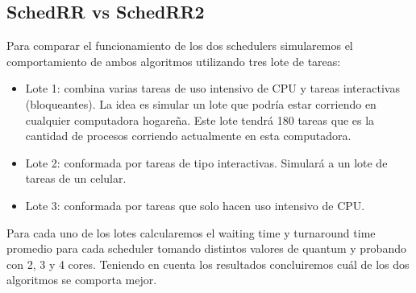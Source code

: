 \subsection{SchedRR vs SchedRR2}

Para comparar el funcionamiento de los dos schedulers simularemos el comportamiento de ambos algoritmos utilizando tres lote de tareas:
\begin{itemize}
	\item Lote 1: combina varias tareas de uso intensivo de CPU y tareas interactivas (bloqueantes). La idea es simular un lote que podría estar corriendo en cualquier computadora hogareña. Este lote tendrá 180 tareas que es la cantidad de procesos corriendo actualmente en esta computadora.
	\item Lote 2: conformada por tareas de tipo interactivas. Simulará a un lote de tareas de un celular.
	\item Lote 3: conformada por tareas que solo hacen uso intensivo de CPU.
\end{itemize}
Para cada uno de los lotes calcularemos el waiting time y turnaround time promedio para cada scheduler tomando distintos valores de quantum y probando con 2, 3 y 4 cores. Teniendo en cuenta los resultados concluiremos cuál de los dos algoritmos se comporta mejor.
